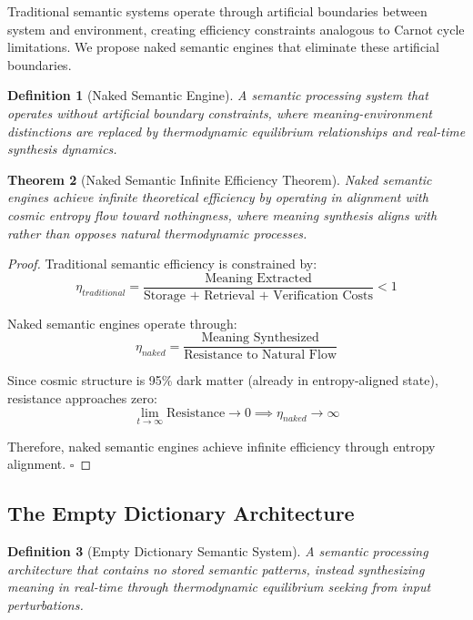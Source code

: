 \documentclass[11pt,a4paper]{article}
\newtheorem{theorem}{Theorem}[section]
\newtheorem{definition}[theorem]{Definition}
\begin{document}
Traditional semantic systems operate through artificial boundaries between system and environment, creating efficiency constraints analogous to Carnot cycle limitations. We propose naked semantic engines that eliminate these artificial boundaries.

\begin{definition}[Naked Semantic Engine]
A semantic processing system that operates without artificial boundary constraints, where meaning-environment distinctions are replaced by thermodynamic equilibrium relationships and real-time synthesis dynamics.
\end{definition}

\begin{theorem}[Naked Semantic Infinite Efficiency Theorem]
Naked semantic engines achieve infinite theoretical efficiency by operating in alignment with cosmic entropy flow toward nothingness, where meaning synthesis aligns with rather than opposes natural thermodynamic processes.
\end{theorem}

\begin{proof}
Traditional semantic efficiency is constrained by:
\begin{equation}
\eta_{traditional} = \frac{\text{Meaning Extracted}}{\text{Storage + Retrieval + Verification Costs}} < 1
\end{equation}

Naked semantic engines operate through:
\begin{equation}
\eta_{naked} = \frac{\text{Meaning Synthesized}}{\text{Resistance to Natural Flow}}
\end{equation}

Since cosmic structure is 95\% dark matter (already in entropy-aligned state), resistance approaches zero:
\begin{equation}
\lim_{t \to \infty} \text{Resistance} \to 0 \implies \eta_{naked} \to \infty
\end{equation}

Therefore, naked semantic engines achieve infinite efficiency through entropy alignment. $\square$
\end{proof}

\subsection{The Empty Dictionary Architecture}

\begin{definition}[Empty Dictionary Semantic System]
A semantic processing architecture that contains no stored semantic patterns, instead synthesizing meaning in real-time through thermodynamic equilibrium seeking from input perturbations.
\end{definition}
\end{document}
